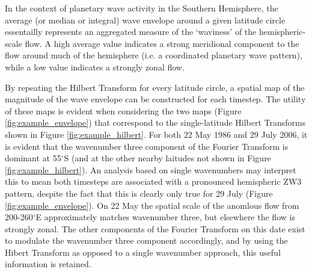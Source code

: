 In the context of planetary wave activity in the Southern Hemisphere, the average (or median or integral) wave envelope around a given latitude circle essentailly represents an aggregated measure of the `waviness' of the hemispheric-scale flow. A high average value indicates a strong meridional component to the flow around much of the hemisphere (i.e. a coordinated planetary wave pattern), while a low value indicates a strongly zonal flow. 

By repeating the Hilbert Transform for every latitude circle, a spatial map of the magnitude of the wave envelope can be constructed for each timestep. The utility of these maps is evident when considering the two maps (Figure \ref{fig:example_envelope}) that correspond to the single-latitude Hilbert Transforms shown in Figure \ref{fig:example_hilbert}. For both 22 May 1986 and 29 July 2006, it is evident that the wavenumber three component of the Fourier Transform is dominant at 55$^{\circ}$S (and at the other nearby laitudes not shown in Figure \ref{fig:example_hilbert}). An analysis based on single wavenumbers may interpret this to mean both timesteps are associated with a pronounced hemispheric ZW3 pattern, despite the fact that this is clearly only true for 29 July (Figure \ref{fig:example_envelope}). On 22 May the spatial scale of the anomlous flow from 200-260$^{\circ}$E approximately matches wavenumber three, but elsewhere the flow is strongly zonal. The other components of the Fourier Transform on this date exist to modulate the wavenumber three component accordingly, and by using the Hibert Transform as opposed to a single wavenumber approach, this useful information is retained.
